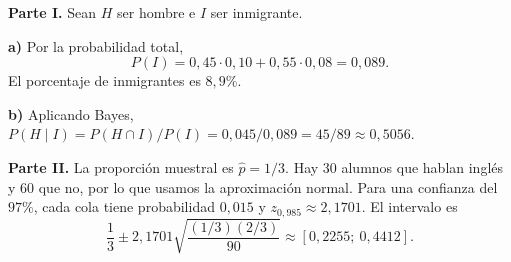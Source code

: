 \textbf{Parte I.} Sean $H$ ser hombre e $I$ ser inmigrante.

\textbf{a)} Por la probabilidad total,
\[
 P(I)=0{,}45\cdot0{,}10+0{,}55\cdot0{,}08=0{,}089.
\]
El porcentaje de inmigrantes es $\boxed{8{,}9\%}$.

\textbf{b)} Aplicando Bayes, $P(H\mid I)=P(H\cap I)/P(I)=0{,}045/0{,}089=\boxed{45/89}\approx0{,}5056$.

\textbf{Parte II.} La proporción muestral es $\hat p=1/3$. Hay 30 alumnos que hablan inglés y 60 que no, por lo que usamos la aproximación normal. Para una confianza del $97\%$, cada cola tiene probabilidad $0{,}015$ y $z_{0{,}985}\approx2{,}1701$. El intervalo es
\[
 \frac13\pm2{,}1701\sqrt{\frac{(1/3)(2/3)}{90}}
 \approx\boxed{[0{,}2255;\ 0{,}4412]}.
\]
